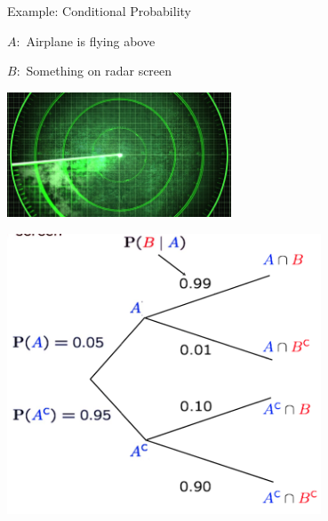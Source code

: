 \documentclass[handout,fleqn,aspectratio=169]{beamer}
\begin{document}
\begin{frame}{Example: Conditional Probability}

{
\plitemsep 0.05in
\bci

\item $A:$ Airplane is flying above
\item $B:$ Something on radar screen

\eci 




}
{
\centering
\includegraphics[width=0.5\textwidth]{L2_radar.jpg}

\bigskip
\includegraphics[width=0.7\textwidth]{L2_cond_ex.png}
}
\end{frame}
\end{document}
